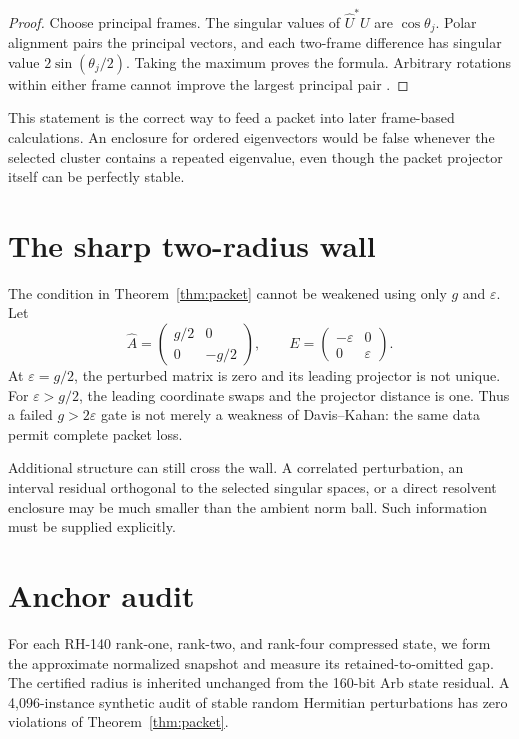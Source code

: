 \documentclass[12pt]{article}
\begin{document}
\begin{proof}
Choose principal frames.  The singular values of
$\widehat U^*U$ are $\cos\theta_j$.  Polar alignment pairs the principal
vectors, and each two-frame difference has singular value
$2\sin(\theta_j/2)$.  Taking the maximum proves the formula.  Arbitrary
rotations within either frame cannot improve the largest principal pair
\citep{Bhatia1997}.
\end{proof}

This statement is the correct way to feed a packet into later frame-based
calculations.  An enclosure for ordered eigenvectors would be false whenever
the selected cluster contains a repeated eigenvalue, even though the packet
projector itself can be perfectly stable.

\section{The sharp two-radius wall}
The condition in Theorem~\ref{thm:packet} cannot be weakened using only
$g$ and $\varepsilon$.  Let
\[
 \widehat A=\begin{pmatrix}g/2&0\\0&-g/2\end{pmatrix},
 \qquad
 E=\begin{pmatrix}-\varepsilon&0\\0&\varepsilon\end{pmatrix}.
\]
At $\varepsilon=g/2$, the perturbed matrix is zero and its leading projector
is not unique.  For $\varepsilon>g/2$, the leading coordinate swaps and the
projector distance is one.  Thus a failed $g>2\varepsilon$ gate is not merely
a weakness of Davis--Kahan: the same data permit complete packet loss.

Additional structure can still cross the wall.  A correlated perturbation,
an interval residual orthogonal to the selected singular spaces, or a direct
resolvent enclosure may be much smaller than the ambient norm ball.  Such
information must be supplied explicitly.

\section{Anchor audit}
For each RH-140 rank-one, rank-two, and rank-four compressed state, we form
the approximate normalized snapshot and measure its retained-to-omitted gap.
The certified radius is inherited unchanged from the 160-bit Arb state
residual.  A 4,096-instance synthetic audit of stable random Hermitian
perturbations has zero violations of Theorem~\ref{thm:packet}.
\end{document}
